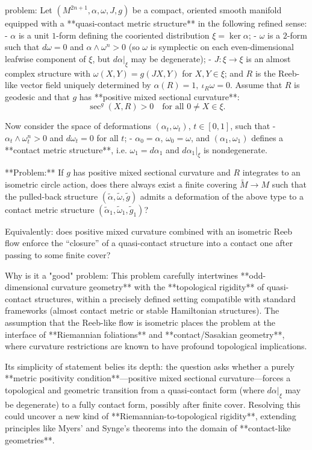 problem:  
Let \((M^{2n+1}, \alpha, \omega, J, g)\) be a compact, oriented smooth manifold equipped with a **quasi-contact metric structure** in the following refined sense:  
- \(\alpha\) is a unit \(1\)-form defining the cooriented distribution \(\xi = \ker \alpha\);  
- \(\omega\) is a \(2\)-form such that \(d\omega = 0\) and \(\alpha \wedge \omega^n > 0\) (so \(\omega\) is symplectic on each even-dimensional leafwise component of \(\xi\), but \(d\alpha|_{\xi}\) may be degenerate);  
- \(J:\xi \to \xi\) is an almost complex structure with \(\omega(X,Y)=g(JX,Y)\) for \(X,Y \in \xi\); and \(R\) is the Reeb-like vector field uniquely determined by \(\alpha(R)=1,\ \iota_R\omega=0\).  
Assume that \(R\) is geodesic and that \(g\) has **positive mixed sectional curvature**:
\[
\sec^g(X,R) > 0 \quad \text{for all } 0 \ne X \in \xi.
\]

Now consider the space of deformations \((\alpha_t, \omega_t)\), \(t \in [0,1]\), such that  
- \(\alpha_t \wedge \omega_t^n > 0\) and \(d\omega_t = 0\) for all \(t\);  
- \(\alpha_0 = \alpha\), \(\omega_0 = \omega\), and \((\alpha_1,\omega_1)\) defines a **contact metric structure**, i.e. \(\omega_1 = d\alpha_1\) and \(d\alpha_1|_\xi\) is nondegenerate.  

**Problem:**  
If \(g\) has positive mixed sectional curvature and \(R\) integrates to an isometric circle action, does there always exist a finite covering \(\tilde M \to M\) such that the pulled-back structure \((\tilde \alpha, \tilde \omega, \tilde g)\) admits a deformation of the above type to a contact metric structure \((\tilde \alpha_1, \tilde \omega_1, \tilde g_1)\)?  

Equivalently: does positive mixed curvature combined with an isometric Reeb flow enforce the “closure” of a quasi-contact structure into a contact one after passing to some finite cover?

Why is it a "good" problem:  
This problem carefully intertwines **odd-dimensional curvature geometry** with the **topological rigidity** of quasi-contact structures, within a precisely defined setting compatible with standard frameworks (almost contact metric or stable Hamiltonian structures). The assumption that the Reeb-like flow is isometric places the problem at the interface of **Riemannian foliations** and **contact/Sasakian geometry**, where curvature restrictions are known to have profound topological implications.  

Its simplicity of statement belies its depth: the question asks whether a purely **metric positivity condition**—positive mixed sectional curvature—forces a topological and geometric transition from a quasi-contact form (where \(d\alpha|_{\xi}\) may be degenerate) to a fully contact form, possibly after finite cover. Resolving this could uncover a new kind of **Riemannian-to-topological rigidity**, extending principles like Myers' and Synge's theorems into the domain of **contact-like geometries**.  

